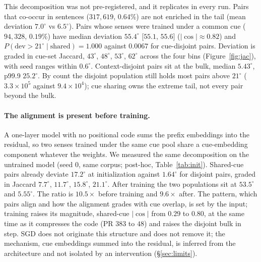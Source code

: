 \documentclass{article}
\newcommand{\degr}{^{\circ}}
\begin{document}
This decomposition was not pre-registered, and it replicates in every run. Pairs
that co-occur in sentences ($317{,}619$, $0.64\%$) are not enriched in the tail
(mean deviation $7.0\degr$ vs $6.5\degr$). Pairs whose senses were trained under a
common cue ($94{,}328$, $0.19\%$) have median deviation $55.4\degr$
[$55.1$, $55.6$] ($|\cos|\approx0.82$) and
$P(\text{dev}>21\degr\mid\text{shared})=1.000$ against $0.0067$ for cue-disjoint
pairs. Deviation is graded in cue-set Jaccard, $43\degr$, $48\degr$, $53\degr$,
$62\degr$ across the four bins (Figure~\ref{fig:jac}), with seed ranges within
$0.6\degr$. Context-disjoint pairs sit at the bulk, median $5.43\degr$, p99.9
$25.2\degr$. By count the disjoint population still holds most pairs above
$21\degr$ ($3.3\times10^5$ against $9.4\times10^4$); cue sharing owns the extreme
tail, not every pair beyond the bulk.

\paragraph{The alignment is present before training.} A one-layer model with no
positional code sums the prefix embeddings into the residual, so two senses trained
under the same cue pool share a cue-embedding component whatever the weights. We
measured the same decomposition on the untrained model (seed 0, same corpus;
post-hoc, Table~\ref{tab:init}). Shared-cue pairs already deviate $17.2\degr$ at
initialization against $1.64\degr$ for disjoint pairs, graded in Jaccard
$7.7\degr$, $11.7\degr$, $15.8\degr$, $21.1\degr$. After training the two
populations sit at $53.5\degr$ and $5.55\degr$. The ratio is $10.5\times$ before
training and $9.6\times$ after. The pattern, which pairs align and how the
alignment grades with cue overlap, is set by the input; training raises its
magnitude, shared-cue $|\cos|$ from $0.29$ to $0.80$, at the same time as it
compresses the code (PR $383$ to $48$) and raises the disjoint bulk in step. SGD
does not originate this structure and does not remove it; the mechanism, cue
embeddings summed into the residual, is inferred from the architecture and not
isolated by an intervention (\S\ref{sec:limits}).
\end{document}
